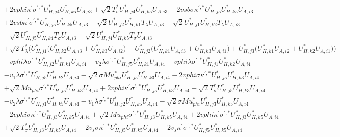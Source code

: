 \begin{align}
 &+2 vphi \kappa^\prime \sigma^{\prime,*} U^*_{{H},{j 4}} U^*_{{H},{k 5}} U_{A,{i 3}} +\sqrt{2} T_{\sigma}^* U^*_{{H},{j 4}} U^*_{{H},{k 5}} U_{A,{i 3}} -2 vsb \sigma \kappa^{\prime,*} U^*_{{H},{j 5}} U^*_{{H},{k 5}} U_{A,{i 3}} \nonumber \\ 
 &+2 vsb \kappa^\prime \sigma^{\prime,*} U^*_{{H},{j 5}} U^*_{{H},{k 5}} U_{A,{i 3}} - \sqrt{2} U^*_{{H},{j 2}} U^*_{{H},{k 1}} T_{\lambda} U_{A,{i 3}} - \sqrt{2} U^*_{{H},{j 1}} U^*_{{H},{k 2}} T_{\lambda} U_{A,{i 3}} \nonumber \\ 
 &- \sqrt{2} U^*_{{H},{j 5}} U^*_{{H},{k 4}} T_{\sigma} U_{A,{i 3}} - \sqrt{2} U^*_{{H},{j 4}} U^*_{{H},{k 5}} T_{\sigma} U_{A,{i 3}} \nonumber \\ 
 &+\sqrt{2} T_{\lambda}^* \Big(U^*_{{H},{j 1}} \Big(U^*_{{H},{k 2}} U_{A,{i 3}}  + U^*_{{H},{k 3}} U_{A,{i 2}} \Big) + U^*_{{H},{j 2}} \Big(U^*_{{H},{k 1}} U_{A,{i 3}}  + U^*_{{H},{k 3}} U_{A,{i 1}} \Big) + U^*_{{H},{j 3}} \Big(U^*_{{H},{k 1}} U_{A,{i 2}}  + U^*_{{H},{k 2}} U_{A,{i 1}} \Big)\Big)\nonumber \\ 
 &- vphi \lambda \sigma^{\prime,*} U^*_{{H},{j 2}} U^*_{{H},{k 1}} U_{A,{i 4}} - v_2 \lambda \sigma^{\prime,*} U^*_{{H},{j 5}} U^*_{{H},{k 1}} U_{A,{i 4}} - vphi \lambda \sigma^{\prime,*} U^*_{{H},{j 1}} U^*_{{H},{k 2}} U_{A,{i 4}} \nonumber \\ 
 &- v_1 \lambda \sigma^{\prime,*} U^*_{{H},{j 5}} U^*_{{H},{k 2}} U_{A,{i 4}} - \sqrt{2} \sigma Mu_{phi}^* U^*_{{H},{j 5}} U^*_{{H},{k 3}} U_{A,{i 4}} -2 vphi \sigma \kappa^{\prime,*} U^*_{{H},{j 5}} U^*_{{H},{k 3}} U_{A,{i 4}} \nonumber \\ 
 &+\sqrt{2} Mu_{phi} \sigma^{\prime,*} U^*_{{H},{j 5}} U^*_{{H},{k 3}} U_{A,{i 4}} +2 vphi \kappa^\prime \sigma^{\prime,*} U^*_{{H},{j 5}} U^*_{{H},{k 3}} U_{A,{i 4}} +\sqrt{2} T_{\sigma}^* U^*_{{H},{j 5}} U^*_{{H},{k 3}} U_{A,{i 4}} \nonumber \\ 
 &- v_2 \lambda \sigma^{\prime,*} U^*_{{H},{j 1}} U^*_{{H},{k 5}} U_{A,{i 4}} - v_1 \lambda \sigma^{\prime,*} U^*_{{H},{j 2}} U^*_{{H},{k 5}} U_{A,{i 4}} - \sqrt{2} \sigma Mu_{phi}^* U^*_{{H},{j 3}} U^*_{{H},{k 5}} U_{A,{i 4}} \nonumber \\ 
 &-2 vphi \sigma \kappa^{\prime,*} U^*_{{H},{j 3}} U^*_{{H},{k 5}} U_{A,{i 4}} +\sqrt{2} Mu_{phi} \sigma^{\prime,*} U^*_{{H},{j 3}} U^*_{{H},{k 5}} U_{A,{i 4}} +2 vphi \kappa^\prime \sigma^{\prime,*} U^*_{{H},{j 3}} U^*_{{H},{k 5}} U_{A,{i 4}} \nonumber \\ 
 &+\sqrt{2} T_{\sigma}^* U^*_{{H},{j 3}} U^*_{{H},{k 5}} U_{A,{i 4}} -2 v_s \sigma \kappa^{\prime,*} U^*_{{H},{j 5}} U^*_{{H},{k 5}} U_{A,{i 4}} +2 v_s \kappa^\prime \sigma^{\prime,*} U^*_{{H},{j 5}} U^*_{{H},{k 5}} U_{A,{i 4}} \nonumber \\ 

\end{align}

